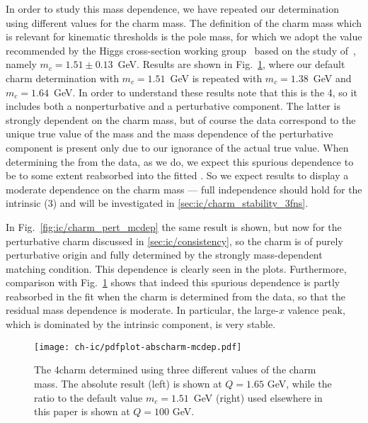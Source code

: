 In order to study this mass dependence, we have repeated our determination using different values for the charm mass.
The definition of the charm mass which is relevant for kinematic
thresholds is the pole mass, for which we adopt the value recommended
by the Higgs cross-section working group~\cite{deFlorian:2016spz}
based on the study of~\cite{Bauer:2004ve}, namely
 $m_c = 1.51 \pm 0.13$~GeV. 
%
Results are shown in Fig.~\ref{fig:ic/charm_fitted_mcdep}, where
our default charm \pdf determination with  $m_c = 1.51$~GeV is
repeated with $m_c=1.38$~GeV and
$m_c=1.64$~GeV.
%
In order to understand these results note that this is
the 4\fns \pdf, so it includes 
both a nonperturbative and a perturbative component. The latter is
strongly dependent on the charm mass, but of course the data
correspond to the unique true value of the mass and the mass
dependence of the perturbative component is present only due to our
ignorance of the actual true value. When determining the \pdf from the
data, as we do, we expect this spurious dependence to be to some extent
reabsorbed into the fitted \pdf. So we expect results to display a
moderate dependence on the charm mass --- full independence should
hold for the intrinsic (3\fns) \pdf and will be investigated in
\cref{sec:ic/charm_stability_3fns}. 

In Fig.~\ref{fig:ic/charm_pert_mcdep} the same result is shown, but now
for the perturbative charm \pdf discussed in
\cref{sec:ic/consistency},  so the charm \pdf is of
purely perturbative origin and fully determined by the strongly
mass-dependent matching condition. This dependence is clearly seen in
the plots. Furthermore, comparison with
Fig.~\ref{fig:ic/charm_fitted_mcdep} shows that indeed this spurious
dependence is partly reabsorbed in the fit when the charm \pdf is
determined from the data, so that  the residual mass dependence is moderate.
In particular, the large-$x$ valence peak, which is dominated by the
intrinsic component, is very stable.

\begin{figure}[t]
  \begin{center}
    \texttt{[image: ch-ic/pdfplot-abscharm-mcdep.pdf]}
    \caption{\small The 4\fns charm \pdf determined
    using three different values of the charm mass. The absolute
    result (left) is shown at $Q=1.65$ GeV, while the ratio to the 
       default value
       $m_c=1.51$~GeV (right) used elsewhere in this paper is shown at $Q=100$ GeV.
   \label{fig:ic/charm_fitted_mcdep} }
\end{center}
\end{figure}


